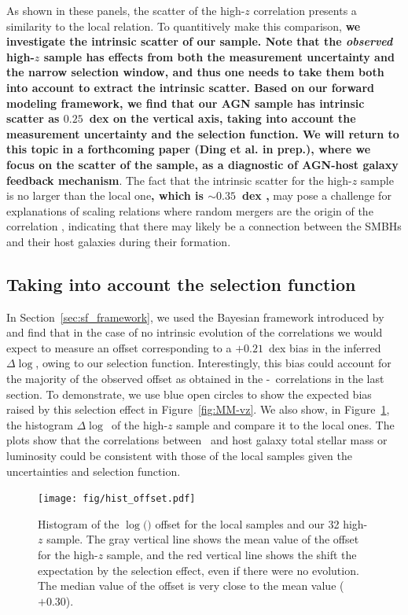 \documentclass[apj]{emulateapj}
\begin{document}
As shown in these panels, the scatter of the high-$z$ correlation presents a similarity to the local relation. To quantitively make this comparison, {\bf we investigate the intrinsic scatter of our sample. Note that the {\it observed} high-$z$ sample has effects from both the measurement uncertainty and the narrow selection window, and thus one needs to take them both into account to extract the intrinsic scatter. Based on our forward modeling framework, we find that our AGN sample has intrinsic scatter as $0.25$~dex on the vertical axis, taking into account the measurement uncertainty and the selection function. We will return to this topic in a forthcoming paper (Ding et al. in prep.), where we focus on the scatter of the sample, as a diagnostic of AGN-host galaxy feedback mechanism}. The fact that the intrinsic scatter for the high-$z$ sample is no larger than the local one{\bf, which is $\sim0.35$~dex \citep{Gul++09},} may pose a challenge for explanations of scaling relations where random mergers are the origin of the correlation \citep{Peng2007,Jahnke2011}, indicating that there may likely be a connection between the SMBHs and their host galaxies during their formation.

\subsection{Taking into account the selection function}
\label{select_eff}

In Section~\ref{sec:sf_framework}, we used the Bayesian framework introduced by \citet{Schulze2011} and find that in the case of no intrinsic evolution of the correlations we would expect to measure an offset corresponding to a $+0.21$~dex bias in the inferred $\Delta \log$\mbh, owing to our selection function. Interestingly, this bias could account for the majority of the observed offset as obtained in the \mbh-\smass\ correlations in the last section. %
To demonstrate, we use blue open circles to show the expected bias raised by this selection effect in Figure~\ref{fig:MM-vz}. We also show, in Figure~\ref{fig:offset_hist}, the histogram $\Delta \log$\mbh\ of the high-$z$ sample and compare it to the local ones. 
The plots show that the correlations between \mbh\ and host galaxy total stellar mass or luminosity could be consistent with those of the local samples given the uncertainties and selection function.


\begin{figure}
\centering
{
\texttt{[image: fig/hist\_offset.pdf]}
}
\caption{\label{fig:offset_hist} 
Histogram of the $\log($\mbh$)$ offset for the local samples and our 32 high-$z$ sample. The gray vertical line shows the mean value of the offset for the high-$z$ sample, and the red vertical line shows the shift the expectation by the selection effect, even if there were no evolution. The median value of the offset is very close to the mean value ($+0.30$).
}
\end{figure} 
\end{document}
